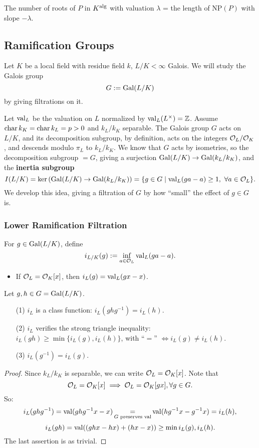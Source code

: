 \begin{theorem}
    The number of roots of $P$ in $K^{\mathrm{alg}}$ with valuation $\lambda$ = the length of $\mathrm{NP}(P)$ with slope $-\lambda$.
\end{theorem}

\subsection{Ramification Groups}

Let $K$ be a local field with residue field $k$, $L/K<\infty$ Galois. We will study the Galois group \[G := \operatorname{Gal}(L/K)\] by giving filtrations on it.

Let $\operatorname{val}_L$ be the valuation on $L$ normalized by $\operatorname{val}_L(L^\times) = \mathbb{Z}$.
Assume $\operatorname{char} k_K = \operatorname{char} k_L = p > 0$ and $k_L/k_K$ separable.
The Galois group $G$ acts on $L/K$,
and its decomposition subgroup, by definition, acts on the integers $\mathcal{O}_L/\mathcal{O}_K$, and descends modulo $\pi_L$ to $k_L/k_K$.
We know that $G$ acts by isometries,
so the decomposition subgroup $= G$,
giving a surjection $\operatorname{Gal}(L/K)\to \operatorname{Gal}(k_L/k_K)$,
and the \textbf{inertia subgroup}\[I(L/K) = \ker\left( \operatorname{Gal}(L/K)\to\operatorname{Gal}(k_L/k_K) \right) = \{g\in G\mid \operatorname{val}_L(ga - a)\ge 1,\ \forall a\in\mathcal{O}_L\}.\]
We develop this idea, giving a filtration of $G$ by how ``small'' the effect of $g\in G$ is.

\subsubsection{Lower Ramification Filtration}
For $g\in \operatorname{Gal}(L/K)$, define \[i_{L/K}(g) := \inf_{a\in\mathcal{O}_L}\operatorname{val}_L(ga - a).\]
\begin{itemize}
    \item If $\mathcal{O}_L = \mathcal{O}_K[x]$, then $i_L(g) = \operatorname{val}_L(gx - x)$.
\end{itemize}
\begin{proposition}\label{property of lower index}
    Let $g, h\in G = \operatorname{Gal}(L/K)$.\begin{enumerate}
        \item [(1)] $i_L$ is a class function: $i_L(ghg^{-1}) = i_L(h)$.
        \item [(2)] $i_L$ verifies the strong triangle inequality: $i_L(gh)\ge \min\{i_L(g), i_L(h)\}$, with ``$=$'' $\iff i_L(g)\ne i_L(h)$.
        \item [(3)] $i_L(g^{-1}) = i_L(g)$.
    \end{enumerate}
\end{proposition}
\begin{proof}
    Since $k_L/k_K$ is separable, we can write $\mathcal{O}_L = \mathcal{O}_K[x]$.
    Note that \[\mathcal{O}_L = \mathcal{O}_K[x]\implies \mathcal{O}_L = \mathcal{O}_K[gx], \forall g\in G.\]
    So:
\[i_L(ghg^{-1}) = \operatorname{val}(ghg^{-1}x - x) \mathop{=}_{G\text{ preserves val}} \operatorname{val}(hg^{-1}x - g^{-1}x) = i_L(h),\]
\[i_L(gh) = \operatorname{val}((ghx - hx) + (hx - x))\ge \min{i_L(g), i_L(h)}.\]
The last assertion is as trivial.
\end{proof}

